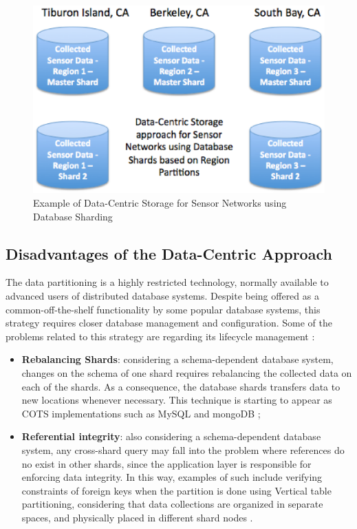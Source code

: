 \begin{figure}
  \centering
  \includegraphics[scale=0.5]{../diagrams/database-sharding-by-region}
  \caption{Example of Data-Centric Storage for Sensor Networks using Database
  Sharding}
  \label{fig:database-sharding-by-region}
\end{figure}

\subsection{Disadvantages of the Data-Centric Approach}

The data partitioning is a highly restricted technology, normally available to
advanced users of distributed database systems. Despite being offered as a
common-off-the-shelf functionality by some popular database systems, this
strategy requires closer database management and configuration. Some of the
problems related to this strategy are regarding its lifecycle management
\cite{db-shard-discussion}:

\begin{itemize}
  \item \textbf{Rebalancing Shards}: considering a schema-dependent database
  system, changes on the schema of one shard requires rebalancing the
  collected data on each of the shards. As a consequence, the database shards
  transfers data to new locations whenever necessary. This technique is
  starting to appear as COTS implementations such as MySQL \cite{mysql} and
  mongoDB \cite{mongodb};
  \item \textbf{Referential integrity}: also considering a schema-dependent
  database system, any cross-shard query may fall into the problem where
  references do no exist in other shards, since the application layer is
  responsible for enforcing data integrity. In this way, examples of such
  include verifying constraints of foreign keys when the partition is done
  using Vertical table partitioning, considering that data collections are
  organized in separate spaces, and physically placed in different shard nodes
  \cite{db-partitioning-relational}.
\end{itemize}

